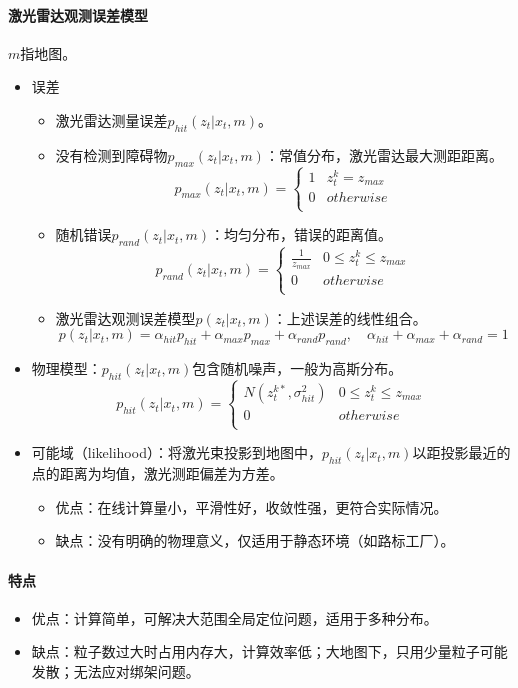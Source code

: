 \documentclass[
12pt, %
a4paper, 
oneside, %
headinclude,footinclude, %
]{scrartcl}
\begin{document}
\paragraph{激光雷达观测误差模型}
$ m $指地图。
\begin{itemize}
\item 误差
\begin{itemize}
\item 激光雷达测量误差$ p_{hit}(z_t|x_t, m) $。
\item 没有检测到障碍物$ p_{max}(z_t|x_t, m) $：常值分布，激光雷达最大测距距离。
$$ p_{max}(z_t|x_t, m) = \begin{cases} 1 & z_t^k = z_{max} \\ 0 & otherwise \\ \end{cases} $$
\item 随机错误$ p_{rand}(z_t|x_t, m) $：均匀分布，错误的距离值。
$$ p_{rand}(z_t|x_t, m) = \begin{cases} \frac{1}{z_{max}} & 0 \leq z_t^k \leq z_{max} \\ 0 & otherwise \\ \end{cases} $$
\item 激光雷达观测误差模型$ p(z_t|x_t, m) $：上述误差的线性组合。
$$ p(z_t|x_t, m) = \alpha_{hit}p_{hit} + \alpha_{max}p_{max} + \alpha_{rand}p_{rand}, \quad \alpha_{hit} + \alpha_{max} + \alpha_{rand} = 1 $$
\end{itemize}
\item 物理模型：$ p_{hit}(z_t|x_t, m) $包含随机噪声，一般为高斯分布。
$$ p_{hit}(z_t|x_t, m) = \begin{cases} N(z_t^{k*}, \sigma_{hit}^2) & 0 \leq z_t^k \leq z_{max} \\ 0 & otherwise \\ \end{cases} $$
\item 可能域（likelihood）：将激光束投影到地图中，$ p_{hit}(z_t|x_t, m) $以距投影最近的点的距离为均值，激光测距偏差为方差。
\begin{itemize}
\item 优点：在线计算量小，平滑性好，收敛性强，更符合实际情况。
\item 缺点：没有明确的物理意义，仅适用于静态环境（如路标工厂）。
\end{itemize}
\end{itemize}
\paragraph{特点}
\begin{itemize}
\item 优点：计算简单，可解决大范围全局定位问题，适用于多种分布。
\item 缺点：粒子数过大时占用内存大，计算效率低；大地图下，只用少量粒子可能发散；无法应对绑架问题。
\end{itemize}
\end{document}
